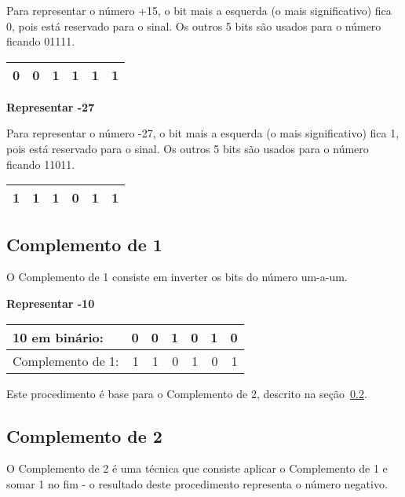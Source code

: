 Para representar o número +15, o bit mais a esquerda (o mais significativo) fica 0, pois está reservado para o sinal. Os outros 5 bits são usados para o número ficando 01111.

\begin{table}[h]
	\centering
	\begin{tabular}{|r|r|r|r|r|r|}
		\hline
		0 & 0 & 1  & 1 &  1 & 1 \\
		\hline
	\end{tabular}
\end{table}

\noindent\textbf{Representar -27}

Para representar o número -27, o bit mais a esquerda (o mais significativo) fica 1, pois está reservado para o sinal. Os outros 5 bits são usados para o número ficando 11011.

\begin{table}[h]
	\centering
	\begin{tabular}{|r|r|r|r|r|r|}
		\hline
		1 & 1 & 1  & 0 &  1 & 1 \\
		\hline
	\end{tabular}
\end{table}

\subsection{Complemento de 1}
\label{compl1}
O Complemento de 1 consiste em inverter os bits do número um-a-um. 

\noindent\textbf{Representar -10}
\begin{table}[h]
	\centering
	\begin{tabular}{|l|r|r|r|r|r|r|}
		\hline
		10 em binário: 		& 0 & 0 & 1  & 0 &  1 & 0 \\
		\hline
		Complemento de 1: 	& 1 & 1 & 0  & 1 &  0 & 1 \\
		\hline
	\end{tabular}
\end{table}

Este procedimento é base para o Complemento de 2, descrito na seção~\ref{compl2}. 

\subsection{Complemento de 2}
\label{compl2}
O Complemento de 2 é uma técnica que consiste aplicar o Complemento de 1 e somar 1 no fim - o resultado deste procedimento representa o número negativo. 

